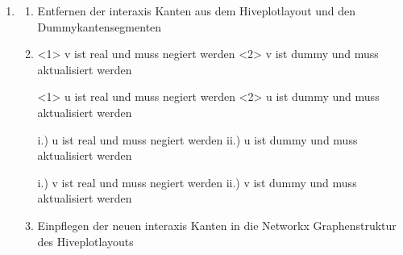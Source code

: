\documentclass[a4paper,10pt,ngerman]{sphinxmanual}
\begin{document}
\begin{fulllineitems}
\begin{fulllineitems}
\begin{enumerate}
\end{enumerate}
\begin{enumerate}
%
\setcounter{enumi}{7}
\item {} \begin{description}
\begin{enumerate}
%
\item {} 
\sphinxAtStartPar
Entfernen der inter\sphinxhyphen{}axis Kanten aus dem Hiveplotlayout und den Dummykantensegmenten

\item {} \begin{description}
\begin{description}
\begin{description}
\sphinxAtStartPar
\textless{}1\textgreater{} v ist real und muss negiert werden
\textless{}2\textgreater{} v ist dummy und muss aktualisiert werden

\sphinxAtStartPar
\textless{}1\textgreater{} u ist real und muss negiert werden
\textless{}2\textgreater{} u ist dummy und muss aktualisiert werden

\end{description}

\sphinxAtStartPar
i.) u ist real und muss negiert werden
ii.) u ist dummy und muss aktualisiert werden

\sphinxAtStartPar
i.) v ist real und muss negiert werden
ii.) v ist dummy und muss aktualisiert werden

\end{description}

\end{description}

\item {} 
\sphinxAtStartPar
Einpflegen der neuen inter\sphinxhyphen{}axis Kanten in die Networkx Graphenstruktur des Hiveplotlayouts

\end{enumerate}

\end{description}


\end{enumerate}
\end{fulllineitems}
\end{fulllineitems}
\end{document}
